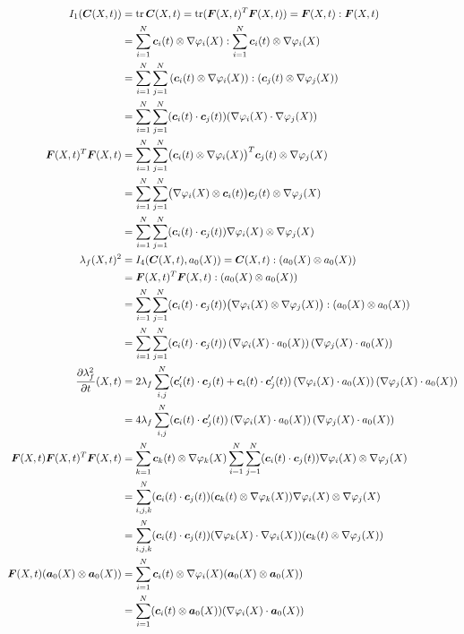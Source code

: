 \begin{align}
	I_1(\vC(X,t)) &= \tr\vC(X,t) = \tr(\vF(X,t)^T\vF(X,t)) = \vF(X,t) : \vF(X,t)\nonumber\\
	&= \sumi \vc_i(t)\otimes \dpi : \sumi \vc_i(t)\otimes \dpi\nonumber\\
	&= \sumi\sumj \left(\vc_i(t)\otimes \dpi\right) : (\vc_j(t)\otimes \dpj)\nonumber\\
	&= \sumi\sumj (\vc_i(t) \cdot \vc_j(t))(\dpi \cdot \dpj)\label{eq:I1_basis}\\
	\vF(X,t)^T\vF(X,t) &= \sumi\sumj \bigl(\vc_i(t)\otimes\dpi\bigr)^T\vc_j(t)\otimes\dpj\nonumber\\
	 &= \sumi\sumj \bigl(\dpi\otimes\vc_i(t)\bigr)\vc_j(t)\otimes\dpj\nonumber\\
	 &=\sumi\sumj (\vc_i(t)\cdot \vc_j(t))\dpi\otimes\dpj\nonumber\\
	\lambda_f(X,t)^2 &=I_4(\vC(X,t),a_0(X)) = \vC(X,t):(a_0(X)\otimes a_0(X))\nonumber\\
			&=  \vF(X,t)^T\vF(X,t) : (a_0(X)\otimes a_0(X))\nonumber\\
			&=  \sumi\sumj (\vc_i(t)\cdot \vc_j(t))\bigl(\dpi\otimes\dpj\bigr) : (a_0(X)\otimes a_0(X))\nonumber\\
			&=  \sumi\sumj (\vc_i(t)\cdot \vc_j(t))\left(\dpi\cdot a_0(X)\right)(\dpj\cdot a_0(X))\label{eq:lambdaf_basis}\\
	\d{\lambda_f^2}{t}(X,t) &= 2\lambda_f \suml{i,j}{N} (\vc'_i(t)\cdot \vc_j(t) + \vc_i(t)\cdot \vc'_j(t))\left(\dpi\cdot a_0(X)\right)(\dpj\cdot a_0(X))\nonumber\\
		&= 4\lambda_f \suml{i,j}{N} (\vc_i(t)\cdot \vc'_j(t))\left(\dpi\cdot a_0(X)\right)(\dpj\cdot a_0(X))\nonumber\\
    \vF(X,t)\vF(X,t)^T\vF(X,t) &= \sumk\vc_k(t)\otimes\dpk\sumi\sumj (\vc_i(t)\cdot \vc_j(t))\dpi\otimes\dpj\nonumber\\
    	&= \suml{i,j,k}{N}(\vc_i(t)\cdot \vc_j(t))(\vc_k(t)\otimes\dpk)\dpi\otimes\dpj\nonumber\\
    	&= \suml{i,j,k}{N}(\vc_i(t)\cdot \vc_j(t))(\dpk\cdot\dpi)(\vc_k(t)\otimes\dpj)\nonumber\\
    \vF(X,t)(\va_0(X)\otimes\va_0(X)) &= \sumi \vc_i(t)\otimes \dpi(\va_0(X)\otimes\va_0(X))\nonumber\\
    &= \sumi (\vc_i(t)\otimes \va_0(X))(\dpi\cdot\va_0(X))\nonumber
\end{align}

